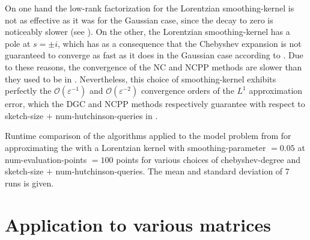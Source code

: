 On one hand the low-rank factorization for the Lorentzian \gls{smoothing-kernel}
is not as effective as it was for the Gaussian case, since the decay to zero
is noticeably slower (see ). On the
other, the Lorentzian \gls{smoothing-kernel} has a pole at $s = \pm i$, which
has as a consequence that the Chebyshev expansion is not guaranteed to converge
as fast as it does in the Gaussian case according to .
Due to these reasons, the convergence of the \gls{NC} and \gls{NCPP} methods
are slower than they used to be in .
Nevertheless, this choice of \gls{smoothing-kernel} exhibits perfectly the 
$\mathcal{O}(\varepsilon^{-1})$ and $\mathcal{O}(\varepsilon^{-2})$ convergence
orders of the $L^1$ approximation error, which the \gls{DGC} and \gls{NCPP}
methods respectively guarantee with respect to
\gls{sketch-size} $+$ \gls{num-hutchinson-queries} in .\\

\begin{table}[ht]
    \caption{Runtime comparison of the algorithms applied to the model problem
    from 
    for approximating the  with a Lorentzian kernel with
    \gls{smoothing-parameter} $=0.05$ at \gls{num-evaluation-points} $=100$
    points for various choices of \gls{chebyshev-degree} and \gls{sketch-size} $+$ \gls{num-hutchinson-queries}.
    The mean and standard deviation of 7 runs is given.}
    \label{tab:5-experiments-timing-haydock}
   
\end{table}


\clearpage
\section{Application to various matrices}
\label{sec:5-experiments-various-matrices}

